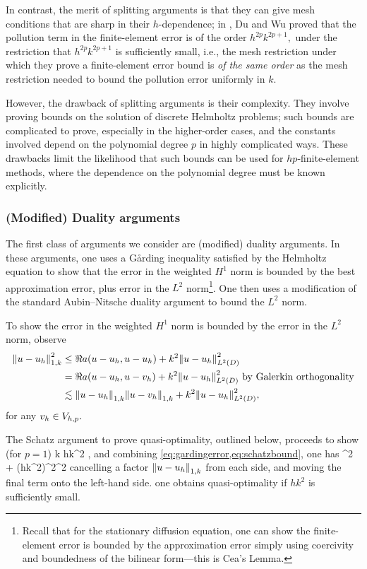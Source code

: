 In contrast, the merit of splitting arguments is that they can give mesh conditions that are sharp in their $h$-dependence; in \cite{DuWu:15}, Du and Wu proved that the pollution term in the finite-element error is of the order $h^{2p}k^{2p+1},$ under the restriction that $h^{2p}k^{2p+1}$ is sufficiently small, i.e., the mesh restriction under which they prove a finite-element error bound is \emph{of the same order} as the mesh restriction needed to bound the pollution error uniformly in $k.$

However, the drawback of splitting arguments is their complexity. They involve proving bounds on the solution of discrete Helmholtz problems; such bounds are complicated to prove, especially in the higher-order cases, and the constants involved depend on the polynomial degree $p$ in highly complicated ways. These drawbacks limit the likelihood that such bounds can be used for $hp$-finite-element methods, where the dependence on the polynomial degree must be known explicitly.


\subsubsection{(Modified) Duality arguments}
The first class of arguments we consider are (modified) duality arguments. In these arguments, one uses a G\r{a}rding inequality satisfied by the Helmholtz equation to show that the error in the weighted $H^1$ norm is bounded by the best approximation error, plus error in the $L^2$ norm\footnote{Recall that for the stationary diffusion equation, one can show the finite-element error is bounded by the approximation error simply using coercivity and boundedness of the bilinear form---this is Cea's Lemma.}. One then uses a modification of the standard Aubin--Nitsche duality argument to bound the $L^2$ norm.

To show the error in the weighted $H^1$ norm is bounded by the error in the $L^2$ norm, observe
\begin{align}
\NW{u-\uh}^2 &\leq \Re{a(u-\uh,u-\uh)} + k^2 \NLtD{u-\uh}^2\nonumber\\
&= \Re{a(u-\uh,u-\vh)} + k^2 \NLtD{u-\uh}^2\text{ by Galerkin orthogonality}\nonumber\\
&\lesssim \NW{u-\uh}\NW{u-\vh} + k^2 \NLtD{u-\uh}^2,\label{eq:gardingerror}
\end{align}
for any $v_{h} \in V_{h,p}.$

The Schatz argument to prove quasi-optimality, outlined below, proceeds to show (for $p=1$)
\beq\label{eq:schatzbound}
k \lesssim hk^2 ,
\eeq
and combining \cref{eq:gardingerror,eq:schatzbound}, one has
\beqs
{}^2 \lesssim {} + \mleft(hk^2\mright)^2^2
\eeqs
cancelling a factor $\NW{u-\uh}$ from each side, and moving the final term onto the left-hand side. one obtains quasi-optimality if $hk^2$ is sufficiently small.


